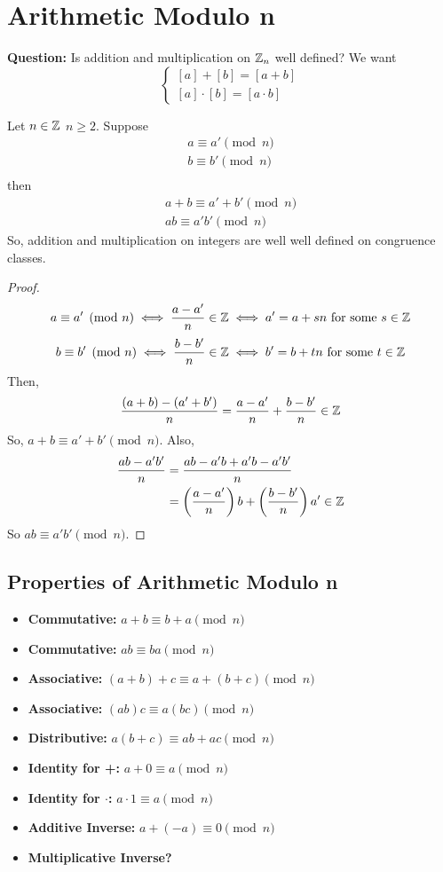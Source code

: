 \documentclass[openany]{report}
\begin{document}
\section{Arithmetic Modulo n}
\textbf{Question:} Is addition and multiplication on $\mathbb{Z}_n$ well defined? We want
\[\begin{cases}
    [a] + [b] = [a+b]\\
    [a] \cdot [b] = [a \cdot b]
\end{cases}\]
\begin{prop}
Let $n \in \mathbb{Z}$ $n \geq 2$. Suppose
\begin{align*}
    a \equiv a' \pmod{n}\\
    b \equiv b' \pmod{n}\\
\end{align*}
then 
\begin{align*}
    a+b \equiv a'+b' \pmod{n}\\
    ab \equiv a'b' \pmod{n}
\end{align*}
So, addition and multiplication on integers are well well defined on congruence classes.
\end{prop}
\begin{proof}
    \[a \equiv a' \pmod{n} \iff \frac{a-a'}{n} \in \mathbb{Z} \iff a' = a + sn \text{ for some } s \in \mathbb{Z}\]
    \[b \equiv b' \pmod{n} \iff \frac{b-b'}{n} \in \mathbb{Z} \iff b' = b + tn \text{ for some } t \in \mathbb{Z}\]
    Then,
    \[\frac{(a+b)- (a'+b')}{n} = \frac{a-a'}{n} + \frac{b - b'}{n} \in \mathbb{Z}\]
    So, $a+b \equiv a'+b' \pmod{n}$. Also,
    \begin{align*}
        \frac{ab - a'b'}{n} &= \frac{ab - a'b + a'b - a'b'}{n}\\
        &= \left(\frac{a-a'}{n}\right)b + \left(\frac{b-b'}{n}\right)a' \in \mathbb{Z}\\
    \end{align*}
    So $ab \equiv a'b' \pmod{n}$.
\end{proof}
\subsection{Properties of Arithmetic Modulo n}
\begin{itemize}
    \item \textbf{Commutative:} $a + b \equiv b + a \pmod{n}$
    \item \textbf{Commutative:} $ab \equiv ba \pmod{n}$
    \item \textbf{Associative:} $(a+b)+c \equiv a+(b+c) \pmod{n}$
    \item \textbf{Associative:} $(ab)c \equiv a(bc) \pmod{n}$
    \item \textbf{Distributive:} $a(b+c) \equiv ab + ac \pmod{n}$
    \item \textbf{Identity for +:} $a + 0 \equiv a \pmod{n}$
    \item \textbf{Identity for $\cdot$:} $a \cdot 1 \equiv a \pmod{n}$
    \item \textbf{Additive Inverse:} $a + (-a) \equiv 0 \pmod{n}$
    \item \textbf{Multiplicative Inverse?}
\end{itemize}
\end{document}
